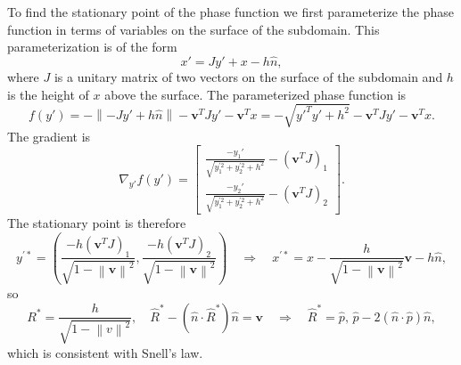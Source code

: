 \documentclass{article}
\newcommand{\norm}[1]{\left\lVert #1 \right\rVert}
\theoremstyle{plain}
\begin{document}
To find the stationary point of the phase function we first parameterize the phase function
in terms of variables on the surface of the subdomain. This parameterization is of the form
\begin{equation}
	x' = Jy' + x - h\hat{n},
\end{equation}
where $J$ is a unitary matrix of two vectors on the surface of the subdomain
and $h$ is the height of $x$ above the surface.
The parameterized phase function is
\begin{equation}
	f(y') = -\norm{-Jy' + h\hat{n}} - \mathbf{v}^T Jy' - \mathbf{v}^T x
	= - \sqrt{ y'^Ty' + h^2 } - \mathbf{v}^T Jy' - \mathbf{v}^T x.
\end{equation}
The gradient is
\begin{equation}
	\nabla_{y'} f(y') = 
	\begin{bmatrix}
		\frac{-y_1'}{\sqrt{y_1^{'2} + y_2^{'2} + h^2}} - (\mathbf{v}^TJ)_1 \\
		\frac{-y_2'}{\sqrt{y_1^{'2} + y_2^{'2} + h^2}} - (\mathbf{v}^TJ)_2
	\end{bmatrix}.
\end{equation} %
The stationary point is therefore
\begin{equation}
	y^{'*} = \left( \frac{-h(\mathbf{v}^TJ)_1}{\sqrt{ 1 - \norm{\mathbf{v}}^2 }}, \frac{-h(\mathbf{v}^TJ)_2}{\sqrt{ 1 - \norm{\mathbf{v}}^2 }} \right)
	\quad\Rightarrow\quad x^{'*} = x - \frac{h}{\sqrt{ 1 - \norm{\mathbf{v}}^2 }}\mathbf{v} - h\hat{n},
\end{equation}
so
\begin{equation}
	R^* = \frac{h}{\sqrt{1-\norm{v}^2}},
	\quad \hat{R}^* - \left( \hat{n}\cdot\hat{R}^* \right)\hat{n} = \mathbf{v}
	\quad\Rightarrow\quad \hat{R}^* =  \hat{p}\text{, } \hat{p} - 2\left( \hat{n}\cdot\hat{p} \right)\hat{n},
\end{equation}
which is consistent with Snell's law.
\end{document}
